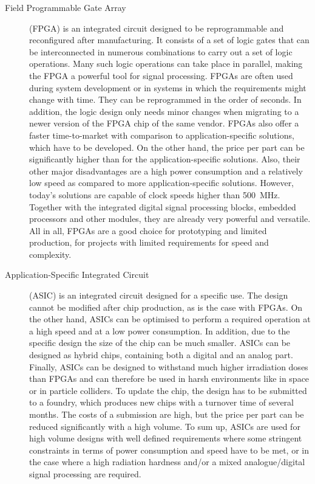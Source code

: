 \begin{description}
\item[Field Programmable Gate Array] (FPGA) is an integrated circuit designed to be reprogrammable and reconfigured after manufacturing. It consists of a set of logic gates that can be interconnected in numerous combinations to carry out a set of logic operations. Many such logic operations can take place in parallel, making the FPGA a powerful tool for signal processing. FPGAs are often used during system development or in systems in which the requirements might change with time. They can be reprogrammed in the order of seconds. In addition, the logic design only needs minor changes when migrating to a newer version of the FPGA chip of the same vendor. FPGAs also offer a faster time-to-market with comparison to application-specific solutions, which have to be developed. On the other hand, the price per part can be significantly higher than for the application-specific solutions. Also, their other major disadvantages are a high power consumption and a relatively low speed as compared to more application-specific solutions. However, today's solutions are capable of clock speeds higher than 500~MHz. Together with the integrated digital signal processing blocks, embedded processors and other modules, they are already very powerful and versatile. All in all, FPGAs are a good choice for prototyping and limited production, for projects with limited requirements for speed and complexity.

\item[Application-Specific Integrated Circuit] (ASIC) is an integrated circuit designed for a specific use. The design cannot be modified after chip production, as is the case with FPGAs. On the other hand, ASICs can be optimised to perform a required operation at a high speed and at a low power consumption. In addition, due to the specific design the size of the chip can be much smaller. ASICs can be designed as hybrid chips, containing both a digital and an analog part. Finally, ASICs can be designed to withstand much higher irradiation doses than FPGAs and can therefore be used in harsh environments like in space or in particle colliders. To update the chip, the design has to be submitted to a foundry, which produces new chips with a turnover time of several months. The costs of a submission are high, but the price per part can be reduced significantly with a high volume. To sum up, ASICs are used for high volume designs with well defined requirements where some stringent constraints in terms of power consumption and speed have to be met, or in the case where a high radiation hardness and/or a mixed analogue/digital signal processing are required.
\end{description} 

